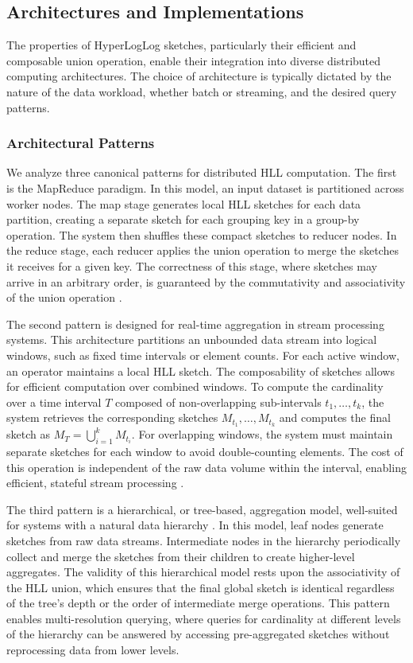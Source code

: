 \subsection{Architectures and Implementations}

The properties of HyperLogLog sketches, particularly their efficient and composable union operation, enable their integration into diverse distributed computing architectures. The choice of architecture is typically dictated by the nature of the data workload, whether batch or streaming, and the desired query patterns.

\subsubsection{Architectural Patterns} \label{subsubsec:hll-patterns}

We analyze three canonical patterns for distributed HLL computation. The first is the MapReduce paradigm. In this model, an input dataset is partitioned across worker nodes. The map stage generates local HLL sketches for each data partition, creating a separate sketch for each grouping key in a group-by operation. The system then shuffles these compact sketches to reducer nodes. In the reduce stage, each reducer applies the union operation to merge the sketches it receives for a given key. The correctness of this stage, where sketches may arrive in an arbitrary order, is guaranteed by the commutativity and associativity of the union operation \cite{Zaharia2012ResilientDD}.

The second pattern is designed for real-time aggregation in stream processing systems. This architecture partitions an unbounded data stream into logical windows, such as fixed time intervals or element counts. For each active window, an operator maintains a local HLL sketch. The composability of sketches allows for efficient computation over combined windows. To compute the cardinality over a time interval $T$ composed of non-overlapping sub-intervals $t_1, \ldots, t_k$, the system retrieves the corresponding sketches $M_{t_1}, \ldots, M_{t_k}$ and computes the final sketch as $M_T = \bigcup_{i=1}^{k} M_{t_i}$. For overlapping windows, the system must maintain separate sketches for each window to avoid double-counting elements. The cost of this operation is independent of the raw data volume within the interval, enabling efficient, stateful stream processing \cite{Huang2016TowardHD}.

The third pattern is a hierarchical, or tree-based, aggregation model, well-suited for systems with a natural data hierarchy \cite{Wilms2021TreebasedNA}. In this model, leaf nodes generate sketches from raw data streams. Intermediate nodes in the hierarchy periodically collect and merge the sketches from their children to create higher-level aggregates. The validity of this hierarchical model rests upon the associativity of the HLL union, which ensures that the final global sketch is identical regardless of the tree's depth or the order of intermediate merge operations. This pattern enables multi-resolution querying, where queries for cardinality at different levels of the hierarchy can be answered by accessing pre-aggregated sketches without reprocessing data from lower levels.


